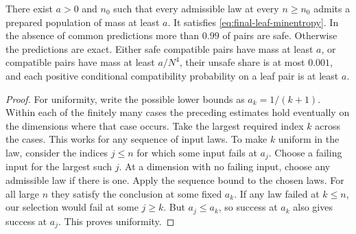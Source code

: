 \begin{proposition}\label{prop:status-preparation}
There exist \(a>0\) and \(n_0\) such that every admissible law at
every \(n\ge n_0\) admits a prepared population of mass at least \(a\).
It satisfies \eqref{eq:final-leaf-minentropy}. In the absence of common
predictions more than \(0.99\) of pairs are safe. Otherwise the
predictions are exact. Either safe compatible pairs have mass at least
\(a\), or compatible pairs have mass at least \(a/N^4\), their unsafe
share is at most \(0.001\), and each positive conditional compatibility
probability on a leaf pair is at least \(a\).
\end{proposition}

\begin{proof}
For uniformity, write the possible lower bounds as \(a_k=1/(k+1)\).
Within each of the finitely many cases the preceding estimates hold
eventually on the dimensions where that case occurs. Take the largest
required index \(k\) across the cases. This works for any sequence of input
laws. To make \(k\) uniform in the law, consider the indices \(j\le n\)
for which some input fails at \(a_j\). Choose a failing input for the
largest such \(j\).
At a dimension with no failing input, choose any admissible law if
there is one. Apply the sequence bound to the chosen laws. For all
large \(n\) they satisfy the conclusion at some fixed \(a_k\).
If any law failed at \(k\le n\), our selection would fail at some
\(j\ge k\). But \(a_j\le a_k\), so success at \(a_k\) also gives
success at \(a_j\). This proves uniformity.
\end{proof}
